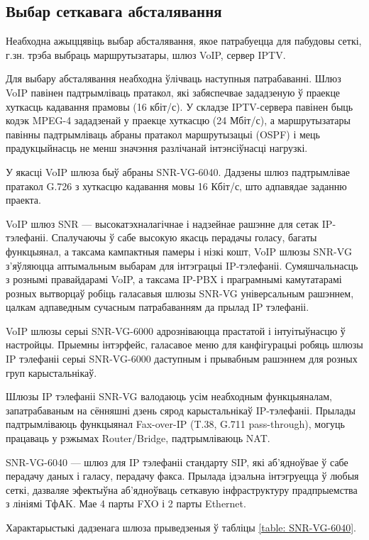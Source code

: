 \subsection{Выбар сеткавага абсталявання}

Неабходна ажыццявіць выбар абсталявання, якое патрабуецца для пабудовы сеткі, г.зн. трэба выбраць маршрутызатары, шлюз VoIP, сервер IPTV.

Для выбару абсталявання неабходна ўлічваць наступныя патрабаванні. Шлюз VoIP павінен падтрымліваць пратакол, які забяспечвае зададзеную ў праекце хуткасць кадавання прамовы (16 кбіт/с). У складзе IPTV-сервера павінен быць кодэк MPEG-4 зададзенай у праекце хуткасцю (24 Мбіт/с), а маршрутызатары павінны падтрымліваць абраны пратакол маршрутызацыі (OSPF) і мець прадукцыйнасць не менш значэння разлічанай інтэнсіўнасці нагрузкі.

У якасці VoIP шлюза быў абраны SNR-VG-6040. Дадзены шлюз падтрымлівае
пратакол G.726 з хуткасцю кадавання мовы 16 Кбіт/с, што адпавядае
заданню праекта.

VoIP шлюз SNR --- высокатэхналагічнае і надзейнае рашэнне для сетак IP-тэлефаніі. Спалучаючы ў сабе высокую якасць перадачы голасу, багаты функцыянал, а таксама кампактныя памеры і нізкі кошт, VoIP шлюзы SNR-VG з'яўляюцца аптымальным выбарам для інтэграцыі IP-тэлефаніі. Сумяшчальнасць з рознымі правайдарамі VoIP, а таксама IP-PBX і праграмнымі камутатарамі розных вытворцаў робіць галасавыя шлюзы SNR-VG універсальным рашэннем, цалкам адпаведным сучасным патрабаванням да прылад IP тэлефаніі.

VoIP шлюзы серыі SNR-VG-6000 адрозніваюцца прастатой і інтуітыўнасцю ў настройцы. Прыемны інтэрфейс, галасавое меню для канфігурацыі робяць шлюзы IP тэлефаніі серыі SNR-VG-6000 даступным і прывабным рашэннем для розных груп карыстальнікаў.

Шлюзы IP тэлефаніі SNR-VG валодаюць усім неабходным функцыяналам, запатрабаваным на сённяшні дзень сярод карыстальнікаў IP-тэлефаніі. Прылады падтрымліваюць функцыянал Fax-over-IP (T.38, G.711 pass-through), могуць працаваць у рэжымах Router/Bridge, падтрымліваюць NAT.

SNR-VG-6040 --- шлюз для IP тэлефаніі стандарту SIP, які аб'ядноўвае ў сабе перадачу даных і галасу, перадачу факса. Прылада ідэальна інтэгруецца ў любыя сеткі, дазваляе эфектыўна аб'ядноўваць сеткавую інфраструктуру прадпрыемства з лініямі ТфАK. Мае 4 парты FXO і 2 парты Ethernet.

Характарыстыкі дадзенага шлюза прыведзеныя ў табліцы
\ref{table: SNR-VG-6040}.

